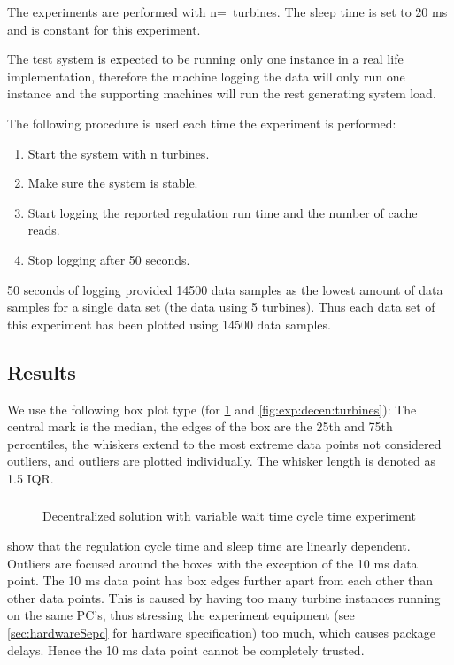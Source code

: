 The experiments are performed with n=\testTurbineNumbers ~turbines. The sleep time is set to 20 ms and is constant for this experiment.

The test system is expected to be running only one instance in a real life implementation, therefore the machine logging the data will only run one instance and the supporting machines will run the rest generating system load.

The following procedure is used each time the experiment is performed:
\begin{enumerate}
	\item Start the system with n turbines.
	\item Make sure the system is stable.
	\item Start logging the reported regulation run time and the number of cache reads.
	\item Stop logging after 50 seconds.
\end{enumerate}

50 seconds of logging provided 14500 data samples as the lowest amount of data samples for a single data set (the data using 5 turbines). Thus each data set of this experiment has been plotted using 14500 data samples.

\subsection{Results} \label{sec:exp:performance}

We use the following box plot type (for \cref{fig:exp:decen:sleep} and \cref{fig:exp:decen:turbines}): The central mark is the median, the edges of the box are the 25th and 75th percentiles, the whiskers extend to the most extreme data points not considered outliers, and outliers are plotted individually. The whisker length is denoted as 1.5 IQR. 

\subsubsection{}

\begin{figure}[h!]
	\centering
%	
	
	\caption{Decentralized solution with variable wait time cycle time experiment}
	\label{fig:exp:decen:sleep}
\end{figure}

 show that the regulation cycle time and sleep time are linearly dependent. Outliers are focused around the boxes with the exception of the 10 ms data point. The 10 ms data point has box edges further apart from each other than other data points. This is caused by having too many turbine instances running on the same PC's, thus stressing the experiment equipment (see \cref{sec:hardwareSepc} for hardware specification) too much, which causes package delays. Hence the 10 ms data point cannot be completely trusted.

